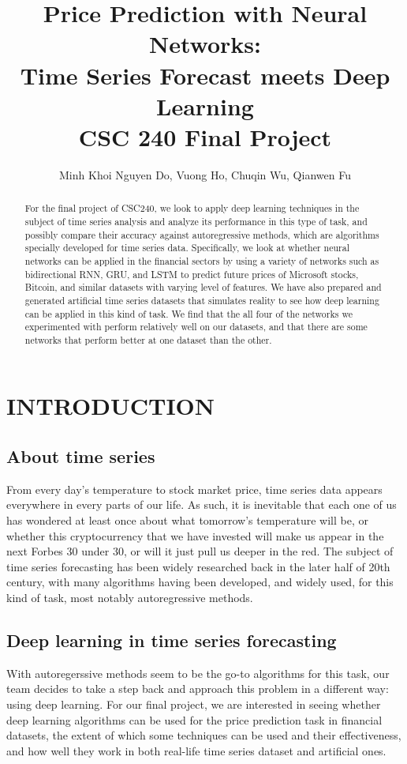 \documentclass[letterpaper, 10 pt, conference]{ieeeconf}  %
\title{\LARGE
\textbf{Price Prediction with Neural Networks:\\ Time Series Forecast meets Deep Learning}\\
\Large
CSC 240 Final Project
}
\author{Minh Khoi Nguyen Do, Vuong Ho, Chuqin Wu, Qianwen Fu}
\begin{document}
\maketitle
\thispagestyle{empty}
\pagestyle{empty}


\begin{abstract}
    For the final project of CSC240, we look to apply deep learning techniques in the subject of time series analysis and analyze its performance in this type of task, and possibly compare their accuracy against autoregressive methods, which are algorithms specially developed for time series data. Specifically, we look at whether neural networks can be applied in the financial sectors by using a variety of networks such as bidirectional RNN, GRU, and LSTM to predict future prices of Microsoft stocks, Bitcoin, and similar datasets with varying level of features. We have also prepared and generated artificial time series datasets that simulates reality to see how deep learning can be applied in this kind of task. We find that the all four of the networks we experimented with perform relatively well on our datasets, and that there are some networks that perform better at one dataset than the other. 

\end{abstract}


\section{INTRODUCTION}
\subsection{About time series}
    From every day's temperature to stock market price, time series data appears everywhere in every parts of our life. As such, it is inevitable that each one of us has wondered at least once about what tomorrow's temperature will be, or whether this cryptocurrency that we have invested will make us appear in the next Forbes 30 under 30, or will it just pull us deeper in the red. The subject of time series forecasting has been widely researched back in the later half of 20th century, with many algorithms having been developed, and widely used, for this kind of task, most notably autoregressive methods.

\subsection{Deep learning in time series forecasting}
    With autoregerssive methods seem to be the go-to algorithms for this task, our team decides to take a step back and approach this problem in a different way: using deep learning. For our final project, we are interested in seeing whether deep learning algorithms can be used for the price prediction task in financial datasets, the extent of which some techniques can be used and their effectiveness, and how well they work in both real-life time series dataset and artificial ones.
\end{document}
